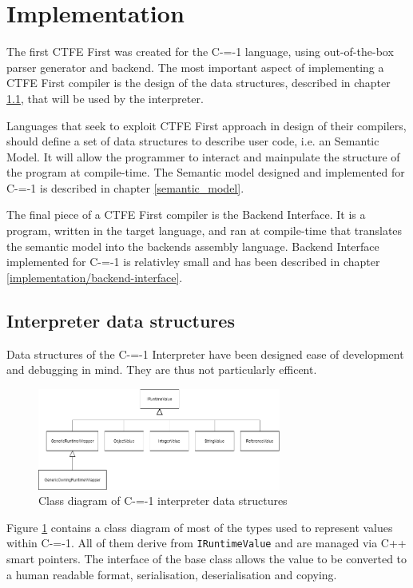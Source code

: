 \section{Implementation}
\label{implementation}

The first CTFE First was created for the C-=-1 language, using out-of-the-box parser generator and backend.
The most important aspect of implementing a CTFE First compiler is the design of the data structures, described in chapter \ref{data_structures}, that will be used by the interpreter.

Languages that seek to exploit CTFE First approach in design of their compilers, should define a set of data structures to describe user code, i.e. an Semantic Model.
It will allow the programmer to interact and mainpulate the structure of the program at compile-time.
The Semantic model designed and implemented for C-=-1 is described in chapter \ref{semantic_model}.

The final piece of a CTFE First compiler is the Backend Interface.
It is a program, written in the target language, and ran at compile-time that translates the semantic model into the backends assembly language.
Backend Interface implemented for C-=-1 is relativley small and has been described in chapter \ref{implementation/backend-interface}.

\subsection{Interpreter data structures}
\label{data_structures}
Data structures of the C-=-1 Interpreter have been designed ease of development and debugging in mind.
They are thus not particularly efficent.

\begin{figure}
	\includegraphics[width=8cm]{pictures/interpreter_data_structures_uml.png}
	\caption{Class diagram of C-=-1 interpreter data structures}
	\label{fig:interpreter_data_structures}
\end{figure}

Figure \ref{fig:interpreter_data_structures} contains a class diagram of most of the types used to represent values within C-=-1.
All of them derive from \lstinline{IRuntimeValue} and are managed via C++ smart pointers.
The interface of the base class allows the value to be converted to a human readable format, serialisation, deserialisation and copying.

